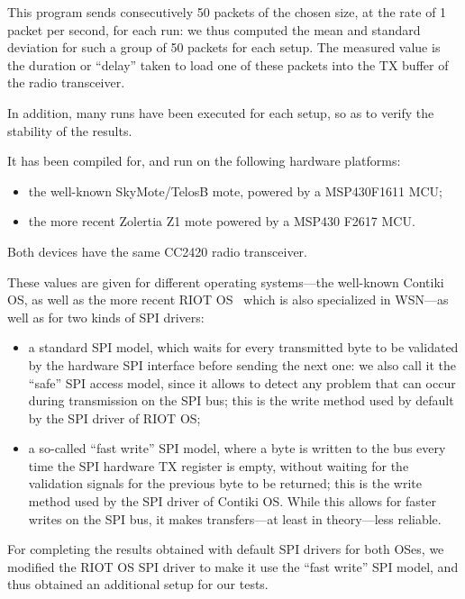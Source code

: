 \documentclass[10pt,emptycopyrightspace]{ewsn-proc}
\begin{document}
This program sends consecutively 50 packets of the chosen size, at the rate
of 1 packet per second, for each run: we thus computed the mean and
standard deviation for such a group of 50 packets for each setup.
The measured value is the duration or ``delay'' taken to load one of these
packets into the TX buffer of the radio transceiver.

In addition, many runs have been executed for each setup, so as to verify
the stability of the results.

It has been compiled for, and run on the following hardware platforms:
\begin{itemize}
\item the well-known SkyMote/TelosB mote, powered by a MSP430F1611 MCU;
\item the more recent Zolertia Z1 mote powered by a MSP430 F2617 MCU.
\end{itemize}
\smallskip
Both devices have the same CC2420 radio transceiver.

\medskip

These values are given for different operating systems---the well-known
Contiki OS, as well as the more recent RIOT OS~\cite{RIOT} which is also
specialized in WSN---as well as for two kinds of SPI drivers:
\begin{itemize}
\item a standard SPI model, which waits for every transmitted byte to be
validated by the hardware SPI interface before sending the next one:
we also call it the ``safe'' SPI access model, since it allows to detect
any problem that can occur during transmission on the SPI bus; this is
the write method used by default by the SPI driver of RIOT OS;
\item a so-called ``fast write'' SPI model, where a byte is written to
the bus every time the SPI hardware TX register is empty, without waiting
for the validation signals for the previous byte to be returned; this is
the write method used by the SPI driver of Contiki OS. While this allows
for faster writes on the SPI bus, it makes transfers---at least in
theory---less reliable.
\end{itemize}

\medskip

For completing the results obtained with default SPI drivers for both OSes,
we modified the RIOT OS SPI driver to make it use the ``fast write''
SPI model, and thus obtained an additional setup for our tests.

\medskip
\end{document}
